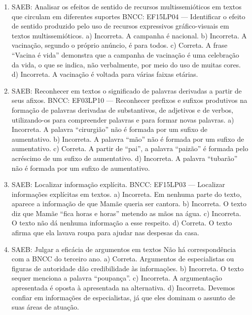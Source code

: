 \begin{enumerate}
\item
SAEB: Analisar os efeitos de sentido de recursos multissemióticos em textos que circulam em diferentes suportes BNCC: EF15LP04 --- Identificar o efeito de sentido produzido pelo uso de recursos expressivos gráfico-visuais em textos multissemióticos. a) Incorreta. A campanha é nacional. b) Incorreta. A vacinação, segundo o próprio anúncio, é para todos. c) Correta. A frase ``Vacina é vida'' demonstra que a campanha de vacinação é uma celebração da vida, o que se indica, não verbalmente, por meio do uso de muitas cores. d) Incorreta. A vacinação é voltada para várias faixas etárias.

\item
SAEB: Reconhecer em textos o significado de palavras derivadas a partir de seus afixos. BNCC: EF03LP10 --- Reconhecer prefixos e sufixos produtivos na formação de palavras derivadas de substantivos, de adjetivos e de verbos, utilizando-os para compreender palavras e para formar novas palavras. a) Incorreta. A palavra ``cirurgião'' não é formada por um sufixo de aumentativo. b) Incorreta. A palavra ``mão'' não é formada por um sufixo de aumentativo. c) Correta. A partir de ``pai'', a palavra ``paizão'' é formada pelo acréscimo de um sufixo de aumentativo. d) Incorreta. A palavra ``tubarão'' não é formada por um sufixo de aumentativo.

\item
SAEB: Localizar informação explícita. BNCC: EF15LP03 --- Localizar informações explícitas em textos. a) Incorreta. Em nenhuma parte do texto, aparece a informação de que Mamãe queria ser cantora. b) Incorreta. O texto diz que Mamãe ``fica horas e horas'' metendo as mãos na água. c) Incorreta. O texto não dá nenhuma informação a esse respeito. d) Correta. O texto afirma que ela lavava roupa para ajudar nas despesas da casa.

\item
SAEB: Julgar a eficácia de argumentos em textos Não há correspondência com a BNCC do terceiro ano. a) Correta. Argumentos de especialistas ou figuras de autoridade dão credibilidade às informações. b) Incorreta. O texto sequer menciona a palavra ``poupança''. c) Incorreta. A argumentação apresentada é oposta à apresentada na alternativa. d) Incorreta. Devemos confiar em informações de especialistas, já que eles dominam o assunto de suas áreas de atuação.
\end{enumerate}


